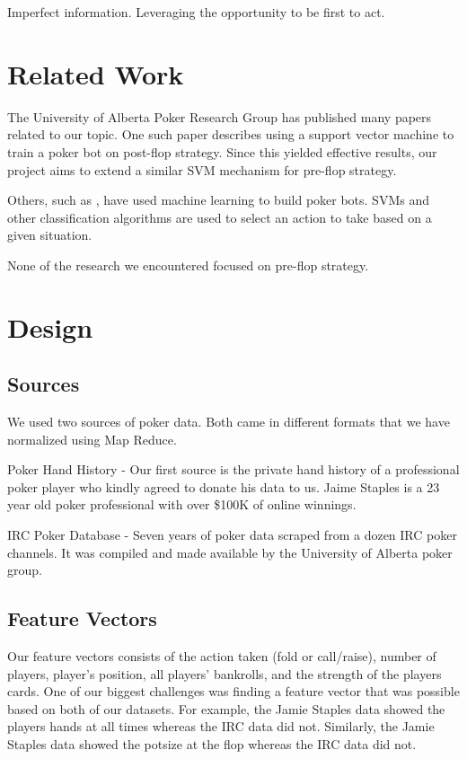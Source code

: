 \documentclass[twoside]{article}
\begin{document}
\begin{multicols}{2}
Imperfect information.
Leveraging the opportunity to be first to act. 


\section{Related Work}

The University of Alberta Poker Research Group has published many papers related to our topic.
One such paper \cite{SVMPoker} describes using a support vector machine to train a poker bot on post-flop strategy. Since this yielded effective results, our project aims to extend a similar SVM mechanism for pre-flop strategy.

Others, such as \cite{holdemml}, have used machine learning to build poker bots. SVMs and other classification algorithms are used to select an action to take based on a given situation.

None of the research we encountered focused on pre-flop strategy. 


\section{Design}


\subsection{Sources}
We used two sources of poker data. Both came in different formats that we have normalized using Map Reduce. 
\begin{compactitem}
\item{Poker Hand History} - Our first source is the private hand history of a professional poker player who kindly agreed to donate his data to us. Jaime Staples is a 23 year old poker professional with over \$100K of online winnings. 
\item{IRC Poker Database} - Seven years of poker data scraped from a dozen IRC poker channels. It was compiled and made available by the University of Alberta poker group.  
\end{compactitem}

\subsection{Feature Vectors}
Our feature vectors consists of the action taken (fold or call/raise), number of players, player's position, all players' bankrolls, and the strength of the players cards. One of our biggest challenges was finding a feature vector that was possible based on both of our datasets. For example, the Jamie Staples data showed the players hands at all times whereas the IRC data did not. Similarly, the Jamie Staples data showed the potsize at the flop whereas the IRC data did not.  


\end{multicols}
\end{document}
